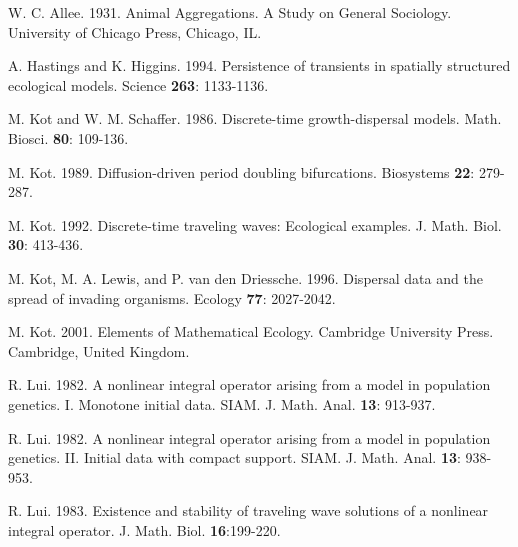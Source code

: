 \documentclass[11pt]{article}
\theoremstyle{definition}
\numberwithin{equation}{section}
\numberwithin{thm}{section}
\begin{document}
\begin{thebibliography}{9}
  W. C. Allee. 1931. Animal Aggregations. A Study on
General Sociology. University of Chicago Press, Chicago, IL.



 A. Hastings and K. Higgins. 1994. Persistence of transients in spatially
structured ecological models. Science {\bf 263}: 1133-1136.



 M. Kot and W. M. Schaffer. 1986.  Discrete-time growth-dispersal models.
Math. Biosci. {\bf 80}: 109-136.


 M. Kot. 1989. Diffusion-driven period doubling bifurcations.
Biosystems {\bf 22}: 279-287.


 M. Kot. 1992. Discrete-time traveling waves:
Ecological examples. J. Math. Biol. {\bf 30}: 413-436.


 M. Kot, M. A. Lewis, and P. van den Driessche. 1996. Dispersal data and the spread of invading
organisms. Ecology {\bf 77}: 2027-2042.






 M. Kot. 2001. Elements of Mathematical Ecology.
Cambridge University Press. Cambridge, United Kingdom.

 R. Lui. 1982. A nonlinear integral operator arising from a model in population
genetics. I. Monotone initial data. SIAM. J. Math. Anal. {\bf 13}:
913-937.

 R. Lui. 1982. A nonlinear integral operator arising from a model in population
genetics. II. Initial data with compact support. SIAM. J. Math.
Anal. {\bf 13}: 938-953.

 R. Lui. 1983. Existence and stability of traveling wave solutions of a nonlinear
integral operator. J. Math. Biol. {\bf 16}:199-220.


\end{thebibliography}
\end{document}
